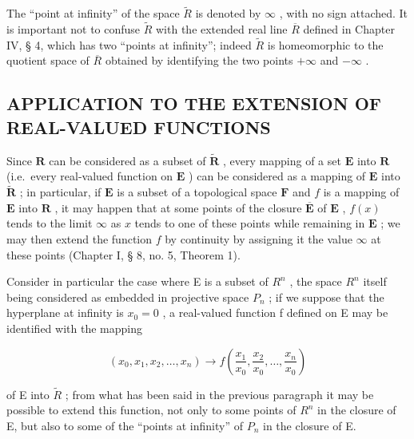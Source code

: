 The ``point at infinity'' of the space \(\tilde{R}\) is denoted by \(\infty\) , with no sign attached. It is important not to confuse \(\tilde{R}\) with the extended real line \(\overline{R}\) defined in Chapter IV, § 4, which has two ``points at infinity''; indeed \(\tilde{R}\) is homeomorphic to the quotient space of \(\overline{R}\) obtained by identifying the two points \(+\infty\) and \(-\infty\) .

\subsection{APPLICATION TO THE EXTENSION OF REAL-VALUED FUNCTIONS}

Since \(\mathbf{R}\) can be considered as a subset of \(\tilde{\mathbf{R}}\) , every mapping of a set \(\mathbf{E}\) into \(\mathbf{R}\) (i.e.~every real-valued function on \(\mathbf{E}\) ) can be considered as a mapping of \(\mathbf{E}\) into \(\tilde{\mathbf{R}}\) ; in particular, if \(\mathbf{E}\) is a subset of a topological space \(\mathbf{F}\) and \(f\) is a mapping of \(\mathbf{E}\) into \(\mathbf{R}\) , it may happen that at some points of the closure \(\overline{\mathbf{E}}\) of \(\mathbf{E}\) , \(f(x)\) tends to the limit \(\infty\) as \(x\) tends to one of these points while remaining in \(\mathbf{E}\) ; we may then extend the function \(f\) by continuity by assigning it the value \(\infty\) at these points (Chapter I, § 8, no. 5, Theorem 1).

Consider in particular the case where E is a subset of \(R^{n}\) , the space \(R^{n}\) itself being considered as embedded in projective space \(P_{n}\) ; if we suppose that the hyperplane at infinity is \(x_{0}=0\) , a real-valued function f defined on E may be identified with the mapping

\[
(x _ {0}, x _ {1}, x _ {2}, \ldots , x _ {n}) \rightarrow f \left(\frac {x _ {1}}{x _ {0}}, \frac {x _ {2}}{x _ {0}}, \ldots , \frac {x _ {n}}{x _ {0}}\right)
\]

of E into \(\tilde{R}\) ; from what has been said in the previous paragraph it may be possible to extend this function, not only to some points of \(R^{n}\) in the closure of E, but also to some of the ``points at infinity'' of \(P_{n}\) in the closure of E.

